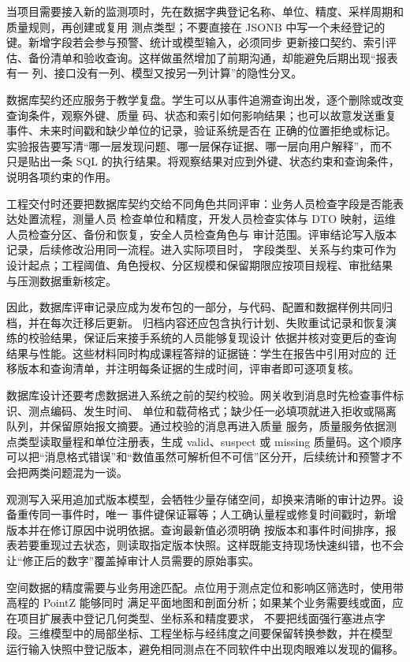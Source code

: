 当项目需要接入新的监测项时，先在数据字典登记名称、单位、精度、采样周期和质量规则，再创建或复用
测点类型；不要直接在 JSONB 中写一个未经登记的键。新增字段若会参与预警、统计或模型输入，必须同步
更新接口契约、索引评估、备份清单和验收查询。这样做虽然增加了前期沟通，却能避免后期出现“报表有一
列、接口没有一列、模型又按另一列计算”的隐性分叉。

数据库契约还应服务于教学复盘。学生可以从事件追溯查询出发，逐个删除或改变查询条件，观察外键、质量
码、状态和索引如何影响结果；也可以故意发送重复事件、未来时间戳和缺少单位的记录，验证系统是否在
正确的位置拒绝或标记。实验报告要写清“哪一层发现问题、哪一层保存证据、哪一层向用户解释”，而不
只是贴出一条 SQL 的执行结果。将观察结果对应到外键、状态约束和查询条件，说明各项约束的作用。

工程交付时还要把数据库契约交给不同角色共同评审：业务人员检查字段是否能表达处置流程，测量人员
检查单位和精度，开发人员检查实体与 DTO 映射，运维人员检查分区、备份和恢复，安全人员检查角色与
审计范围。评审结论写入版本记录，后续修改沿用同一流程。进入实际项目时，
字段类型、关系与约束可作为设计起点；工程阈值、角色授权、分区规模和保留期限应按项目规程、审批结果
与压测数据重新核定。

因此，数据库评审记录应成为发布包的一部分，与代码、配置和数据样例共同归档，并在每次迁移后更新。
归档内容还应包含执行计划、失败重试记录和恢复演练的校验结果，保证后来接手系统的人员能够复现设计
依据并核对变更后的查询结果与性能。这些材料同时构成课程答辩的证据链：学生在报告中引用对应的
迁移版本和查询清单，并注明每条证据的生成时间，评审者即可逐项复核。

数据库设计还要考虑数据进入系统之前的契约校验。网关收到消息时先检查事件标识、测点编码、发生时间、
单位和载荷格式；缺少任一必填项就进入拒收或隔离队列，并保留原始报文摘要。通过校验的消息再进入质量
服务，质量服务依据测点类型读取量程和单位注册表，生成 valid、suspect 或 missing 质量码。这个顺序
可以把“消息格式错误”和“数值虽然可解析但不可信”区分开，后续统计和预警才不会把两类问题混为一谈。

观测写入采用追加式版本模型，会牺牲少量存储空间，却换来清晰的审计边界。设备重传同一事件时，唯一
事件键保证幂等；人工确认量程或修复时间戳时，新增版本并在修订原因中说明依据。查询最新值必须明确
按版本和事件时间排序，报表若要重现过去状态，则读取指定版本快照。这样既能支持现场快速纠错，也不会
让“修正后的数字”覆盖掉审计人员需要的原始事实。

空间数据的精度需要与业务用途匹配。点位用于测点定位和影响区筛选时，使用带高程的 PointZ 能够同时
满足平面地图和剖面分析；如果某个业务需要线或面，应在项目扩展表中登记几何类型、坐标系和精度要求，
不要把线面强行塞进点字段。三维模型中的局部坐标、工程坐标与经纬度之间要保留转换参数，并在模型
运行输入快照中登记版本，避免相同测点在不同软件中出现肉眼难以发现的偏移。

